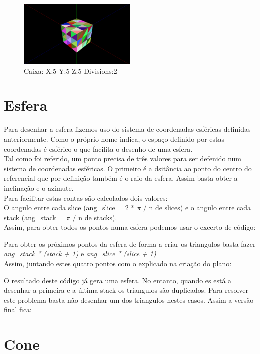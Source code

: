 \documentclass[a4paper]{report}
\begin{document}
\begin{figure}[H]
    \centering 
    \includegraphics[width=0.5\textwidth]{images/box.png}  
    \caption{Caixa: X:5 Y:5 Z:5 Divisions:2}
    \label{fig:box_render}
\end{figure}

\section{Esfera}
Para desenhar a esfera fizemos uso do sistema de coordenadas esféricas definidas
anteriormente. Como o próprio nome indica, o espaço definido por estas
coordenadas é esférico o que facilita o desenho de uma esfera.\\
Tal como foi referido, um ponto precisa de três valores para ser defenido num
sistema de coordenadas esféricas. O primeiro é a dsitância ao ponto do centro do
referencial que por definição também é o raio da esfera. Assim basta obter a
inclinação e o azimute.\\
Para facilitar estas contas são calcolados dois valores:\\
O angulo entre cada slice (ang\_slice = 2 * $\pi$ / n de slices) e o angulo
entre cada stack (ang\_stack = $\pi$ / n de stacks).\\
Assim, para obter todos os pontos numa esfera podemos usar o excerto de código:


Para obter os próximos pontos da esfera de forma a criar os triangulos basta
fazer \textit{ang\_stack * (stack + 1)} e \textit{ang\_slice * (slice + 1)}\\
Assim, juntando estes quatro pontos com o explicado na criação do plano:


O resultado deste código já gera uma esfera. No entanto, quando es está a
desenhar a primeira e a última stack os triangulos são duplicados.
Para resolver este problema basta não desenhar um dos triangulos nestes casos.
Assim a versão final fica:



\section{Cone}
\end{document}
